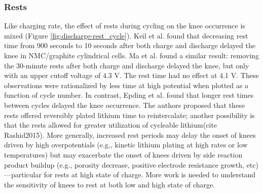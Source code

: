 \documentclass[journal=jpclcd,manuscript=article]{achemso}
\begin{document}
\subsubsection{Rests}

Like charging rate, the effect of rests during cycling on the knee occurrence is mixed (Figure \ref{fig:discharge-rest_cycle}).
Keil et al.\cite{keil_linear_2019} found that decreasing rest time from 900 seconds to 10 seconds after both charge and discharge delayed the knee in NMC/graphite cylindrical cells.
Ma et al.\cite{ma_editors_2019} found a similar result: removing the 30-minute rests after both charge and discharge delayed the knee, but only with an upper cutoff voltage of 4.3 V. The rest time had no effect at 4.1 V.
These observations were rationalized by less time at high potential when plotted as a function of cycle number.
In contrast, Epding et al.\cite{epding_investigation_2019} found that longer rest times between cycles delayed the knee occurrence. The authors proposed that these rests offered reversibly plated lithium time to reintercalate; another possibility is that the rests allowed for greater utilization of cycleable lithium(cite Rashid2015). More generally, increased rest periods may delay the onset of knees driven by high overpotentials (e.g., kinetic lithium plating at high rates or low temperatures) but may exacerbate the onset of knees driven by side reaction product buildup (e.g., porosity decrease, positive electrode resistance growth, etc)---particular for rests at high state of charge. More work is needed to understand the sensitivity of knees to rest at both low and high state of charge.
\end{document}
